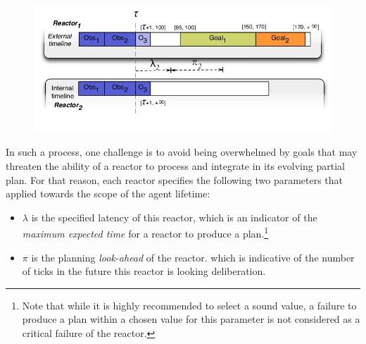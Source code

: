 \begin{figure}[b]
  \centering
  \includegraphics[scale=2.5]{figs/token-disptch.jpeg}
  \caption{\small {}}
  \label{fig:reactor-lookahead}
\end{figure}

In such a process, one challenge is to avoid being overwhelmed by
goals that may threaten the ability of a reactor to process and
integrate in its evolving partial plan. For that reason, each reactor
specifies the following two parameters that  applied
towards the scope of the agent lifetime:

\begin{itemize}

\item $\lambda$ is the specified latency of this reactor, which is an
  indicator of the \emph{maximum expected time} for a reactor to
  produce a plan.\footnote{Note that while it is highly recommended to
    select a sound value, a failure to produce a plan within a chosen
    value for this parameter is not considered as a critical failure
    of the reactor.}

\item $\pi$ is the planning \emph{look-ahead} of the reactor. which is
  indicative of the number of ticks in the future this reactor is
  looking  deliberation.

\end{itemize}

